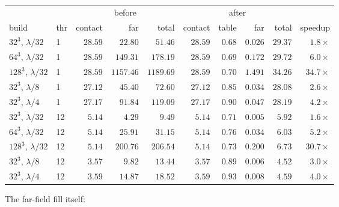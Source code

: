 \begin{center}\footnotesize
\begin{tabular}{@{}llrrrrrrrr@{}}
\toprule
& & \multicolumn{3}{c}{before} & \multicolumn{4}{c}{after} & \\
\cmidrule(lr){3-5}\cmidrule(lr){6-9}
build & thr & contact & far & total & contact & table & far & total & speedup\\
\midrule
$32^3$, $\lambda/32$ & 1 & $28.59$ & $22.80$ & $51.46$ & $28.59$ & $0.68$ & $0.026$ &
$29.37$ & $1.8\times$\\
$64^3$, $\lambda/32$ & 1 & $28.59$ & $149.31$ & $178.19$ & $28.59$ & $0.69$ & $0.172$ &
$29.72$ & $6.0\times$\\
$128^3$, $\lambda/32$ & 1 & $28.59$ & $1157.46$ & $1189.69$ & $28.59$ & $0.70$ & $1.491$ &
$34.26$ & $\mathbf{34.7\times}$\\
$32^3$, $\lambda/8$ & 1 & $27.12$ & $45.40$ & $72.60$ & $27.12$ & $0.85$ & $0.034$ &
$28.08$ & $2.6\times$\\
$32^3$, $\lambda/4$ & 1 & $27.17$ & $91.84$ & $119.09$ & $27.17$ & $0.90$ & $0.047$ &
$28.19$ & $4.2\times$\\
\midrule
$32^3$, $\lambda/32$ & 12 & $5.14$ & $4.29$ & $9.49$ & $5.14$ & $0.71$ & $0.005$ &
$5.92$ & $1.6\times$\\
$64^3$, $\lambda/32$ & 12 & $5.14$ & $25.91$ & $31.15$ & $5.14$ & $0.76$ & $0.034$ &
$6.03$ & $5.2\times$\\
$128^3$, $\lambda/32$ & 12 & $5.14$ & $200.76$ & $206.54$ & $5.14$ & $0.73$ & $0.200$ &
$6.73$ & $\mathbf{30.7\times}$\\
$32^3$, $\lambda/8$ & 12 & $3.57$ & $9.82$ & $13.44$ & $3.57$ & $0.89$ & $0.006$ &
$4.52$ & $3.0\times$\\
$32^3$, $\lambda/4$ & 12 & $3.59$ & $14.87$ & $18.52$ & $3.59$ & $0.93$ & $0.008$ &
$4.59$ & $4.0\times$\\
\bottomrule
\end{tabular}
\end{center}

\noindent
The far-field fill itself:

